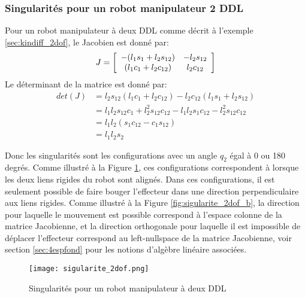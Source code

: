 \subsubsection{Singularités pour un robot manipulateur 2 DDL}

Pour un robot manipulateur à deux DDL comme décrit à l'exemple \ref{sec:kindiff_2dof}, le Jacobien est donné par:
\begin{align}
	J = \left[ \begin{array}{c c}
				   -(l_1 s_1 + l_2 s_{12}) & - l_2 s_{12} \\
				   (l_1 c_1 + l_2 c_{12}) &   l_2 c_{12}
	\end{array} \right]
\end{align}
Le déterminant de la matrice est donné par:
\begin{align}
	det(J) &= l_2 s_{12} (l_1 c_1 + l_2 c_{12}) - l_2 c_{12} (l_1 s_1 + l_2 s_{12}) \\
	&= l_1 l_2 s_{12} c_1 + l_2^2 s_{12} c_{12} - l_1 l_2 s_1 c_{12} - l_2^2 s_{12} c_{12} \\
	&= l_1 l_2 ( s_1 c_{12} - c_1 s_{12} ) \\
	&= l_1 l_2 s_2
\end{align}

Donc les singularités sont les configurations avec un angle $q_2$ égal à 0 ou 180 degrés. Comme illustré à la Figure \ref{fig:sigularite_2dof}, ces configurations correspondent à lorsque les deux liens rigides du robot sont alignés. Dans ces configurations, il est seulement possible de faire bouger l'effecteur dans une direction perpendiculaire aux liens rigides. Comme illustré à la Figure \ref{fig:sigularite_2dof_b}, la direction pour laquelle le mouvement est possible correspond à l'espace colonne de la matrice Jacobienne, et la direction orthogonale pour laquelle il est impossible de déplacer l'effecteur correspond au left-nullspace de la matrice Jacobienne, voir section \ref{sec:4espfond} pour les notions d'algèbre linéaire associées.

\begin{figure}[htbp]
	\centering
	\texttt{[image: sigularite\_2dof.png]}
	\caption{Singularités pour un robot manipulateur à deux DDL}
	\label{fig:sigularite_2dof}
\end{figure}

